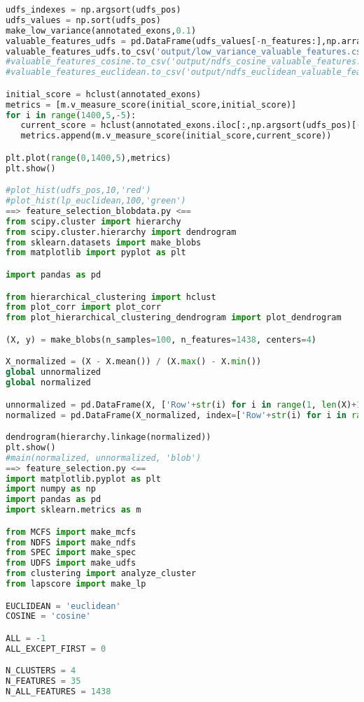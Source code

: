 \begin{lstlisting}[columns=fullflexible,language=Python]
udfs_indexes = np.argsort(udfs_pos)
udfs_values = np.sort(udfs_pos)
make_low_variance(annotated_exons,0.1)
valuable_features_udfs = pd.DataFrame(udfs_values[-n_features:],np.array(annotated_exons.iloc[:,udfs_indexes[-n_features:]].columns.values))
valuable_features_udfs.to_csv('output/low_variance_valuable_features.csv')
#valuable_features_cosine.to_csv('output/ndfs_cosine_valuable_features.csv')
#valuable_features_euclidean.to_csv('output/ndfs_euclidean_valuable_features.csv')

initial_score = hclust(annotated_exons)
metrics = [m.v_measure_score(initial_score,initial_score)]
for i in range(1400,5,-5):
   current_score = hclust(annotated_exons.iloc[:,np.argsort(udfs_pos)[-i:]])
   metrics.append(m.v_measure_score(initial_score,current_score))

plt.plot(range(0,1400,5),metrics)
plt.show()

#plot_hist(udfs_pos,10,'red')
#plot_hist(lp_euclidean,100,'green')
==> feature_selection_blobdata.py <==
from scipy.cluster import hierarchy
from scipy.cluster.hierarchy import dendrogram
from sklearn.datasets import make_blobs
from matplotlib import pyplot as plt

import pandas as pd

from hierarchical_clustering import hclust
from plot_corr import plot_corr
from plot_hierarchical_clustering_dendrogram import plot_dendrogram

(X, y) = make_blobs(n_samples=100, n_features=1438, centers=4)

X_normalized = (X - X.mean()) / (X.max() - X.min())
global unnormalized
global normalized

unnormalized = pd.DataFrame(X, ['Row'+str(i) for i in range(1, len(X)+1)])
normalized = pd.DataFrame(X_normalized, index=['Row'+str(i) for i in range(1, len(X_normalized)+1)])

dendrogram(hierarchy.linkage(normalized))
plt.show()
#main(normalized, unnormalized, 'blob')
==> feature_selection.py <==
import matplotlib.pyplot as plt
import numpy as np
import pandas as pd
import sklearn.metrics as m

from MCFS import make_mcfs
from NDFS import make_ndfs
from SPEC import make_spec
from UDFS import make_udfs
from clustering import analyze_cluster
from lapscore import make_lp

EUCLIDEAN = 'euclidean'
COSINE = 'cosine'

ALL = -1
ALL_EXCEPT_FIRST = 0

N_CLUSTERS = 4
N_FEATURES = 35
N_ALL_FEATURES = 1438


\end{lstlisting}
